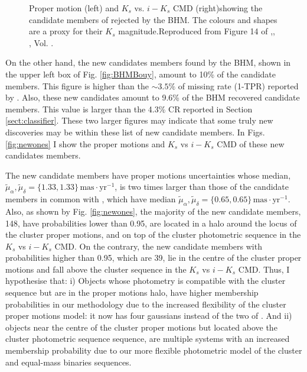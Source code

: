 \begin{figure}[htbp]
\begin{center}
\caption{Proper motion (left) and $K_s$ vs. $i-K_s$ CMD (right)showing the candidate members of \citet{Bouy2015} rejected by the BHM. The colours and shapes are a proxy for their $K_s$ magnitude.Reproduced from Figure 14 of \citet{Olivares2017},\textit{}, , Vol. .}
\label{fig:rejectedsCOLORS}
\end{center}
\end{figure}

On the other hand, the new candidates members found by the BHM, shown in the upper left box of Fig. \ref{fig:BHMBouy}, amount to 10\% of the \citet{Bouy2015} candidate members. This figure is higher than the $\sim 3.5\%$ of missing rate (1-TPR) reported by \citet{Sarro2014}. Also, these new candidates amount to 9.6\% of the BHM recovered candidate members. This value is larger than the 4.3\% CR reported in Section \ref{sect:classifier}. These two larger figures may indicate that some truly new discoveries may be within these list of new candidate members. In Figs. \ref{fig:newones} I show the proper motions and $K_s$ vs $i-K_s$ CMD of these new candidates members.

The new candidate members have proper motions uncertainties whose median, $\tilde{\mu}_{\alpha},\tilde{\mu}_{\delta}=\{1.33,1.33\} \,\mathrm{mas\cdot yr^{-1}}$, is two times larger than those of the candidate members in common with \citet{Bouy2015}, which have median $\tilde{\mu}_{\alpha},\tilde{\mu}_{\delta}=\{0.65,0.65\} \,\mathrm{mas\cdot yr^{-1}}$. Also, as shown by Fig. \ref{fig:newones}, the majority of the new candidate members, 148, have probabilities lower than 0.95, are located in a halo around the locus of the cluster proper motions, and on top of the cluster photometric sequence in the $K_s$ vs $i-K_s$ CMD. On the contrary, the new candidate members with probabilities higher than 0.95, which are 39, lie in the centre of the cluster proper motions and fall above the cluster sequence in the $K_s$ vs $i-K_s$ CMD. Thus, I hypothesise that: i) Objects whose photometry is compatible with the cluster sequence but are in the proper motions halo, have higher membership probabilities in our methodology due to the increased flexibility of the cluster proper motions model: it now has four gaussians instead of the two of \citet{Bouy2015}. And ii) objects near the centre of the cluster proper motions but located above the cluster photometric sequence sequence, are multiple systems \cite[probably triple systems which can amount to 4\% of the population][]{Duquennoy1991} with an increased membership probability due to our more flexible photometric model of the cluster and equal-mass binaries sequences.

